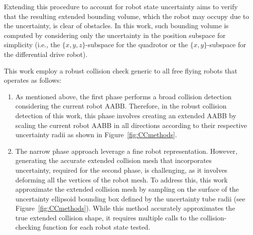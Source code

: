 Extending this procedure to account for robot state uncertainty aims to verify that the resulting extended bounding volume, which the robot may occupy due to the uncertainty, is clear of obstacles.
In this work, such bounding volume is computed by considering only the uncertainty in the position subspace for simplicity (i.e., the $\{x,y,z\}$-subspace for the quadrotor or the $\{x,y\}$-subspace for the differential drive robot).

This work employ a robust collision check generic to all free flying robots that operates as follows:
\begin{enumerate}
    \item As mentioned above, the first phase performs a broad collision detection considering the current robot AABB. 
    Therefore, in the robust collision detection of this work, this phase involves creating an extended AABB by scaling the current robot AABB in all directions according to their respective uncertainty radii as shown in Figure~\ref{fig:CCmethods}. 
    \item The narrow phase approach leverage a fine robot representation.
    However, generating the accurate extended collision mesh that incorporates uncertainty, required for the second phase, is challenging, as it involves deforming all the vertices of the robot mesh.
    To address this, this work approximate the extended collision mesh by sampling on the surface of the uncertainty ellipsoid bounding box defined by the uncertainty tube radii (see Figure~\ref{fig:CCmethods}). 
    While this method accurately approximates the true extended collision shape, it requires multiple calls to the collision-checking function for each robot state tested.
\end{enumerate}

